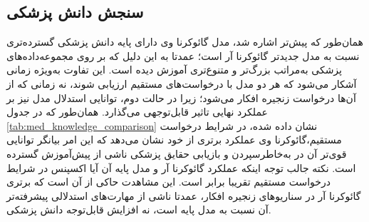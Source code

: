 \subsection{
سنجش دانش پزشکی
}
همان‌طور که پیش‌تر اشاره شد، مدل
گائوکرنا وی دارای پایه دانش پزشکی گسترده‌تری نسبت به مدل جدیدتر گائوکرنا آر است؛ عمدتا به این دلیل که بر روی مجموعه‌داده‌های پزشکی به‌مراتب بزرگ‌تر و متنوع‌تری آموزش دیده است.
این تفاوت به‌ویژه زمانی آشکار می‌شود که هر دو مدل با درخواست‌های مستقیم ارزیابی شوند، نه زمانی که از آن‌ها درخواست زنجیره افکار می‌شود؛ زیرا در حالت دوم، توانایی استدلال مدل نیز بر عملکرد نهایی تاثیر قابل‌توجهی می‌گذارد.
همان‌طور که در جدول
\ref{tab:med_knowledge_comparison}
نشان داده شده، در شرایط درخواست مستقیم،گائوکرنا وی عملکرد برتری از خود نشان می‌دهد که این امر بیانگر توانایی قوی‌تر آن در به‌خاطرسپردن و بازیابی حقایق پزشکی ناشی از پیش‌آموزش گسترده است.
نکته جالب توجه اینکه عملکرد گائوکرنا آر
و مدل پایه آن آیا اکسپنس در شرایط درخواست مستقیم تقریبا برابر است. این مشاهدت حاکی از آن است که برتری گائوکرنا آر در سناریوهای زنجیره افکار، عمدتا ناشی از مهارت‌های استدلالی پیشرفته‌تر آن نسبت به مدل پایه است، نه افزایش قابل‌توجه دانش پزشکی.

